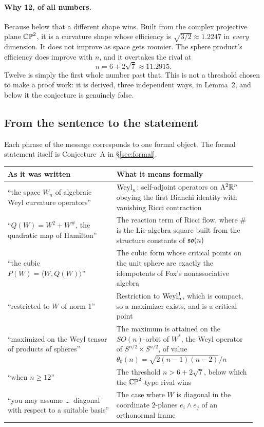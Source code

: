 \paragraph{Why 12, of all numbers.} Because below that a different shape wins. Built from the complex projective plane $\mathbb{CP}^2$, it is a curvature shape whose efficiency is $\sqrt{3/2}\approx1.2247$ in \emph{every} dimension. It does not improve as space gets roomier. The sphere product's efficiency does improve with $n$, and it overtakes the rival at
\[
n=6+2\sqrt7\approx11.2915 .
\]
Twelve is simply the first whole number past that. This is not a threshold chosen to make a proof work: it is derived, three independent ways, in Lemma~2, and below it the conjecture is genuinely false.

\subsection{From the sentence to the statement}

Each phrase of the message corresponds to one formal object. The formal statement itself is Conjecture~A in \S\ref{sec:formal}.

\begin{center}
\begin{tabular}{@{}p{0.42\linewidth}p{0.54\linewidth}@{}}
\toprule
\textbf{As it was written} & \textbf{What it means formally} \\
\midrule
``the space $W_n$ of algebraic Weyl curvature operators'' & $\mathrm{Weyl}_n$: self-adjoint operators on $\Lambda^2\mathbb{R}^n$ obeying the first Bianchi identity with vanishing Ricci contraction \\
``$Q(W)=W^2+W^{\#}$, the quadratic map of Hamilton'' & The reaction term of Ricci flow, where $\#$ is the Lie-algebra square built from the structure constants of $\mathfrak{so}(n)$ \\
``the cubic $P(W)=\langle W,Q(W)\rangle$'' & The cubic form whose critical points on the unit sphere are exactly the idempotents of Fox's nonassociative algebra \\
``restricted to $W$ of norm 1'' & Restriction to $\mathrm{Weyl}^1_n$, which is compact, so a maximizer exists, and is a critical point \\
``maximized on the Weyl tensor of products of spheres'' & The maximum is attained on the $SO(n)$-orbit of $W^{*}$, the Weyl operator of $S^{n/2}\times S^{n/2}$, of value $\theta_0(n)=\sqrt{2(n-1)(n-2)}/n$ \\
``when $n\ge12$'' & The threshold $n>6+2\sqrt7$, below which the $\mathbb{CP}^2$-type rival wins \\
``you may assume \dots\ diagonal with respect to a suitable basis'' & The case where $W$ is diagonal in the coordinate $2$-planes $e_i\wedge e_j$ of an orthonormal frame \\
\bottomrule
\end{tabular}
\end{center}

